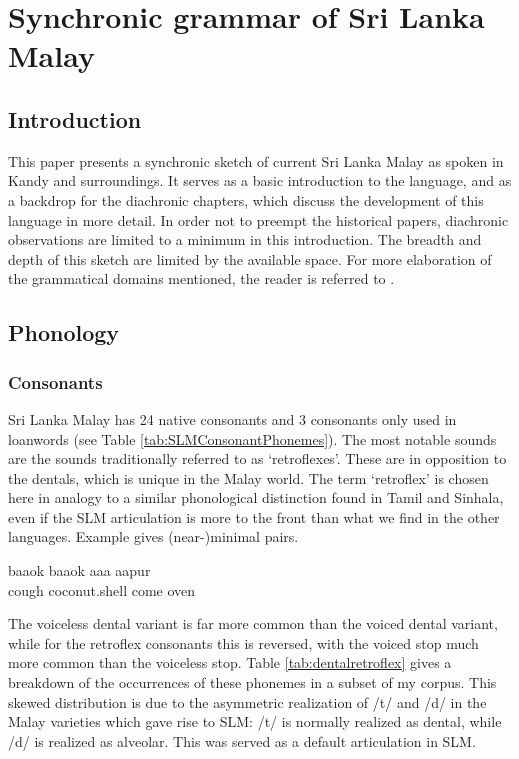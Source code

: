  
\chapter{Synchronic grammar of Sri Lanka Malay}


 
\section{Introduction} 
This paper presents a synchronic sketch of current Sri Lanka Malay as spoken in Kandy and surroundings. It serves as a basic introduction to the language, and as a backdrop for the diachronic chapters, which discuss the development of this language in more detail. In order not to preempt the historical papers, diachronic observations are limited to a minimum in this introduction. The breadth and depth of this sketch are limited by the available space. For more elaboration of the grammatical domains mentioned, the reader is referred to \citet{Nordhoff2009}.


\section{Phonology}

\subsection{Consonants}
Sri Lanka Malay has 24 native consonants and 3 consonants only used in loanwords (see Table \ref{tab:SLMConsonantPhonemes}). The most notable sounds are the sounds traditionally referred to as `retroflexes'. These are in opposition to the dentals, which is unique in the Malay world. The term `retroflex' is chosen here in analogy to a similar phonological distinction found in Tamil and Sinhala, even if the SLM articulation is more to the front than what we find in the other languages. Example  gives (near-)minimal pairs.

\ea\label{ex:minimalpairsstops}
\gll baa\dentt ok baa\tz ok \dentd aa\dentt a\ng{} \dz aapur \\
     cough coconut.shell come oven \\ 
\z

The voiceless dental variant is far more common than the voiced dental variant, while for the retroflex consonants this is reversed, with the voiced stop much more common than the voiceless stop.
Table \ref{tab:dentalretroflex} gives a breakdown of the occurrences of these phonemes in a subset of my corpus. This skewed distribution is due to the asymmetric realization of /t/ and /d/ in the Malay varieties which gave rise to SLM: /t/ is normally realized as dental, while /d/ is realized as alveolar. This was served as a default articulation in SLM.



